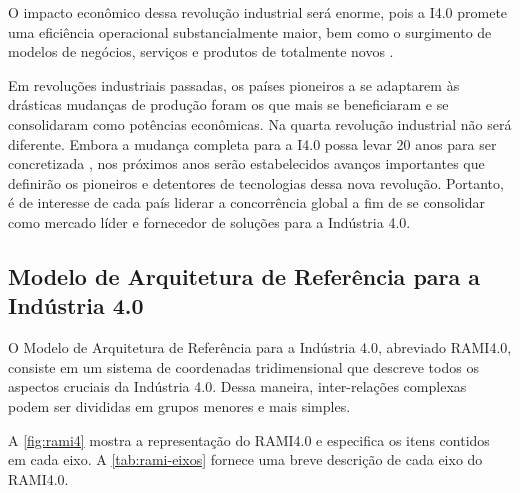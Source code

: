 	O impacto econômico dessa revolução industrial será enorme, pois a I4.0 promete uma eficiência operacional substancialmente maior, bem como o surgimento de modelos de negócios, serviços e produtos de totalmente novos \cite{hermann2016design}.
	
	Em revoluções industriais passadas, os países pioneiros a se adaptarem às drásticas mudanças de produção foram os que mais se beneficiaram e se consolidaram como potências econômicas. Na quarta revolução industrial não será diferente. Embora a mudança completa para a I4.0 possa levar 20 anos para ser concretizada \cite{russmann2015industryfour}, nos próximos anos serão estabelecidos avanços importantes que definirão os pioneiros e detentores de tecnologias dessa nova revolução. Portanto, é de interesse de cada país liderar a concorrência global a fim de se consolidar como mercado líder e fornecedor de soluções para a Indústria 4.0.

	\subsection{Modelo de Arquitetura de Referência para a Indústria 4.0}
	
	O Modelo de Arquitetura de Referência para a Indústria 4.0, abreviado RAMI4.0, consiste em um sistema de coordenadas tridimensional que descreve todos os aspectos cruciais da Indústria 4.0. Dessa maneira, inter-relações complexas podem ser divididas em grupos menores e mais simples.
	
	A \autoref{fig:rami4} mostra a representação do RAMI4.0 e especifica os itens contidos em cada eixo. A \autoref{tab:rami-eixos} fornece uma breve descrição de cada eixo do RAMI4.0.
	
